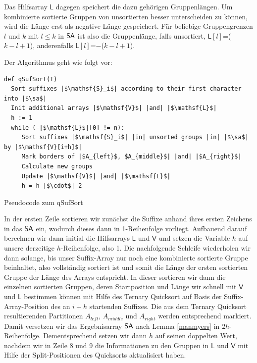 Das Hilfsarray $\mathsf{L}$ dagegen speichert die dazu gehörigen Gruppenlängen. Um kombinierte sortierte Gruppen von unsortierten besser unterscheiden zu können, wird die Länge erst als negative Länge gespeichert. Für beliebige Gruppengrenzen $l$ und $k$ mit $l \leq k$ in $\sa$ ist also die Gruppenlänge, falls unsortiert, $\mathsf{L}[l]$=($k-l+1$), anderenfalls $\mathsf{L}[l]$=$-$($k-l+1$). 

Der Algorithmus geht wie folgt vor:


\begin{listing}
\begin{verbatim}
def qSufSort(T)
  Sort suffixes |$\mathsf{S}_i$| according to their first character into |$\sa$|  
  Init additional arrays |$\mathsf{V}$| |and| |$\mathsf{L}$|
  h := 1
  while (-|$\mathsf{L}$|[0] != n):
     Sort suffixes |$\mathsf{S}_i$| |in| unsorted groups |in| |$\sa$| by |$\mathsf{V}[i+h]$| 
     Mark borders of |$A_{left}$, $A_{middle}$| |and| |$A_{right}$|
     Calculate new groups 
     Update |$\mathsf{V}$| |and| |$\mathsf{L}$|
     h = h |$\cdot$| 2
\end{verbatim}
\caption{Pseudocode zum qSufSort}
\end{listing}


In der ersten Zeile sortieren wir zunächst die Suffixe anhand ihres ersten Zeichens in das $\sa$ ein, wodurch dieses dann in 1-Reihenfolge vorliegt. Aufbauend darauf berechnen wir dann initial die Hilfsarrays $\mathsf{L}$ und $\mathsf{V}$ und setzen die Variable $h$ auf unsere derzeitige $h$-Reihenfolge, also 1.
Die nachfolgende Schleife wiederholen wir dann solange, bis unser Suffix-Array nur noch eine kombinierte sortierte Gruppe beinhaltet, also vollständig sortiert ist und somit die Länge der ersten sortierten Gruppe der Länge des Arrays entspricht.
In dieser sortieren wir dann die einzelnen sortierten Gruppen, deren Startposition und Länge wir schnell mit $\mathsf{V}$ und $\mathsf{L}$ bestimmen können mit Hilfe des Ternary Quicksort auf Basis der Suffix-Array-Position des an $i+h$ startenden Suffixes. Die aus dem Ternary Quicksort resultierenden Partitionen $A_{left}$, $A_{middle}$ und $A_{right}$ werden entsprechend markiert. Damit versetzen wir das Ergebnisarray $\sa$ nach Lemma \ref{manmyers} in $2h$-Reihenfolge. Dementsprechend setzen wir dann $h$ auf seinen doppelten Wert, nachdem wir in Zeile 8 und 9 die Informationen zu den Gruppen in $\mathsf{L}$ und $\mathsf{V}$ mit Hilfe der Split-Positionen des Quicksorts aktualisiert haben.

